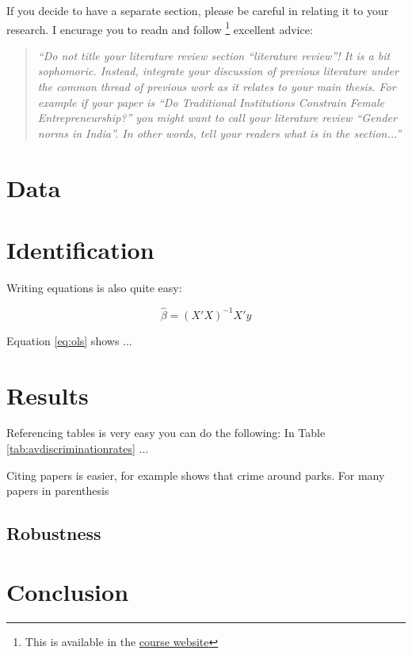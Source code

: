 \documentclass[12pt,a4paper,onecolumn]{article}
\begin{document}
If you decide to have a separate section, please be careful in relating it to your research. I encurage you to readn and follow \cite{nikolov2020writing}\footnote{This is available in the \href{https://ignaciomsarmiento.github.io/teaching/Tesis.html}{course website}} excellent advice:

\begin{quote}
    {\it ``Do not title your literature review section ``literature review''! It is a bit sophomoric. Instead, integrate your discussion of previous literature under the common thread of previous work as it relates to your main thesis.  For example if your paper is ``Do Traditional Institutions Constrain Female Entrepreneurship?'' you might want to call your literature review ``Gender norms in India''. In other words, tell your readers what is in the section...''} \citep{nikolov2020writing}
\end{quote}



\section{Data}

\section{Identification}

Writing equations is also quite easy: 

\begin{equation}
\label{eq:ols}
    \hat{\beta}= (X'X)^{-1}X'y
\end{equation}

Equation \eqref{eq:ols} shows ...

\section{Results}

Referencing tables is very easy you can do the following: In Table \ref{tab:avdiscriminationrates} ...

Citing papers is easier, for example \cite{albouy2020unlocking} shows that crime around parks. For many papers in parenthesis \cite{albouy2020unlocking,mcmillen2019more} 

\subsection{Robustness}
\section{Conclusion}
\end{document}
